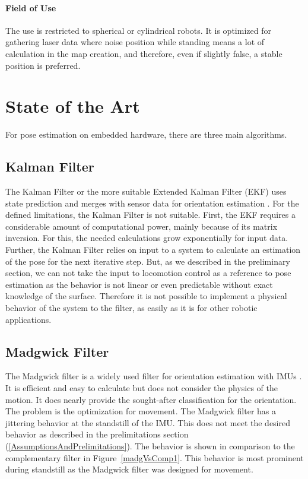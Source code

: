 \documentclass[letterpaper, 10 pt, conference]{ieeeconf}  %
\begin{document}
\paragraph*{Field of Use}
The use is restricted to spherical or cylindrical robots. It is optimized for gathering laser data where noise position while standing means a lot of calculation in the map creation, and therefore, even if slightly false, a stable position is preferred.


\section{State of the Art}
\label{sec:SOA}
For pose estimation on embedded hardware, there are three main algorithms.
\subsection{Kalman Filter}
The Kalman Filter or the more suitable Extended Kalman Filter (EKF) uses state prediction and merges with sensor data for orientation estimation \cite{Kalman1960}.
For the defined limitations, the Kalman Filter is not suitable.
First, the EKF requires a considerable amount of computational power, mainly because of its matrix inversion. For this, the needed calculations grow exponentially for input data.
Further, the Kalman Filter relies on input to a system to calculate an estimation of the pose for the next iterative step.
But, as we described in the preliminary section, we can not take the input to locomotion control as a reference to pose estimation as the behavior is not linear or even predictable without exact knowledge of the surface.
Therefore it is not possible to implement a physical behavior of the system to the filter, as easily as it is for other robotic applications.
\subsection{Madgwick Filter}
The Madgwick filter is a widely used filter for orientation estimation with IMUs \cite{madgwick2010}.
It is efficient and easy to calculate but does not consider the physics of the motion.
It does nearly provide the sought-after classification for the orientation.
The problem is the optimization for movement. The Madgwick filter has a jittering behavior at the standstill of the IMU.
This does not meet the desired behavior as described in the prelimitations section (\ref{AssumptionsAndPrelimitations}).
The behavior is shown in comparison to the complementary filter in Figure~\ref{madgVsComp1}.
This behavior is most prominent during standstill as the Madgwick filter was designed for movement.
\end{document}
